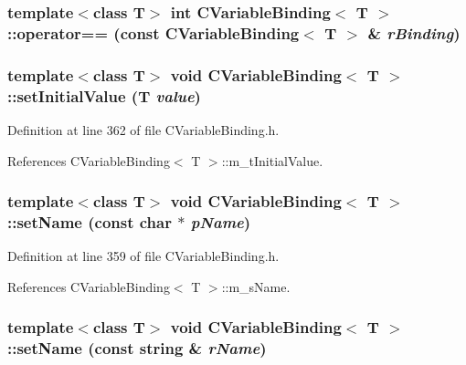 \subsubsection{\setlength{\rightskip}{0pt plus 5cm}template$<$class T$>$ int CVariable\-Binding$<$ T $>$::operator== (const CVariable\-Binding$<$ T $>$ \& {\em r\-Binding})\hspace{0.3cm}{\tt  [private]}}\label{classCVariableBinding_c2}


\subsubsection{\setlength{\rightskip}{0pt plus 5cm}template$<$class T$>$ void CVariable\-Binding$<$ T $>$::set\-Initial\-Value (T {\em value})\hspace{0.3cm}{\tt  [inline]}}\label{classCVariableBinding_a11}




Definition at line 362 of file CVariable\-Binding.h.

References CVariable\-Binding$<$ T $>$::m\_\-t\-Initial\-Value.
\subsubsection{\setlength{\rightskip}{0pt plus 5cm}template$<$class T$>$ void CVariable\-Binding$<$ T $>$::set\-Name (const char $\ast$ {\em p\-Name})\hspace{0.3cm}{\tt  [inline]}}\label{classCVariableBinding_a10}




Definition at line 359 of file CVariable\-Binding.h.

References CVariable\-Binding$<$ T $>$::m\_\-s\-Name.
\subsubsection{\setlength{\rightskip}{0pt plus 5cm}template$<$class T$>$ void CVariable\-Binding$<$ T $>$::set\-Name (const string \& {\em r\-Name})\hspace{0.3cm}{\tt  [inline]}}\label{classCVariableBinding_a9}




